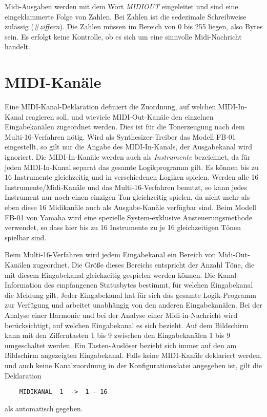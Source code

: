 Midi-Ausgaben werden mit dem Wort \emph{MIDIOUT}
 eingeleitet und
sind eine eingeklammerte Folge von Zahlen. Bei Zahlen ist die sedezimale
Schreibweise zulässig (\#\emph{ziffern}). Die Zahlen
müssen im Bereich von 0 bis 255 liegen, also Bytes sein. Es erfolgt keine
Kontrolle, ob es sich um eine sinnvolle Midi-Nachricht handelt.

    

\chapter{MIDI-Kanäle}\label{cha:midi-kanale}
\label{MIDIKANAL}

Eine MIDI-Kanal-Deklaration definiert die Zuordnung, auf welchen
MIDI-In-Kanal \mutabor{} reagieren soll, und wieviele MIDI-Out-Kanäle
den einzelnen Eingabekanälen zugeordnet werden. Dies ist für die
Tonerzeugung nach dem Multi-16-Verfahren
 nötig. Wird als
Synthesizer-Treiber das Modell FB-01 eingestellt, so gilt nur
die Angabe des MIDI-In-Kanals, der Ausgabekanal wird ignoriert.
Die MIDI-In-Kanäle werden auch als \emph{Instrumente} bezeichnet, da
für jeden MIDI-In-Kanal separat das gesamte Logikprogramm gilt.
Es können bis zu 16 Instrumente gleichzeitig und in
verschiedenen Logiken spielen.
Werden alle 16 Instrumente/Midi-Kanäle
und das Multi-16-Verfahren benutzt, so kann jedes Instrument nur
noch einen einzigen
Ton gleichzeitig spielen, da nicht mehr als eben diese 16 Midikanäle
auch als Ausgabe-Kanäle verfügbar sind. Beim Modell FB-01 von Yamaha wird
eine spezielle System-exklusive Ansteuerungsmethode verwendet,
so dass hier bis zu 16 Instrumente zu je 16 gleichzeitigen Tönen
spielbar sind.

Beim Multi-16-Verfahren wird
jedem Eingabekanal ein Bereich von Midi-Out-Kanälen zugeordnet. Die Größe
dieses Bereichs entspricht der Anzahl Töne,
die mit diesem Eingabekanal gleichzeitig gespielen werden können.
Die Kanal-Information des empfangenen Statusbytes bestimmt, für
welchen Eingabekanal die Meldung gilt.
Jeder Eingabekanal hat für sich das gesamte Logik-Programm
zur Verfügung und arbeitet unabhängig von den anderen Eingabekanälen.
Bei der Analyse einer Harmonie und bei der Analyse einer Midi-in-Nachricht
wird berücksichtigt, auf welchen Eingabekanal es sich bezieht.
Auf dem Bildschirm kann mit den Zifferntasten 1 bis 9 zwischen den
Eingabekanälen 1 bis 9 umgeschaltet werden. Ein Tasten-Auslöser
bezieht sich immer auf den am Bildschirm angezeigten Eingabekanal.
Falls keine MIDI-Kanäle deklariert werden, und auch keine Kanalzuordnung
in der Konfigurationsdatei angegeben ist,
gilt die Deklaration
\begin{verbatim}
	MIDIKANAL  1  ->  1 - 16
\end{verbatim}
als automatisch gegeben.

